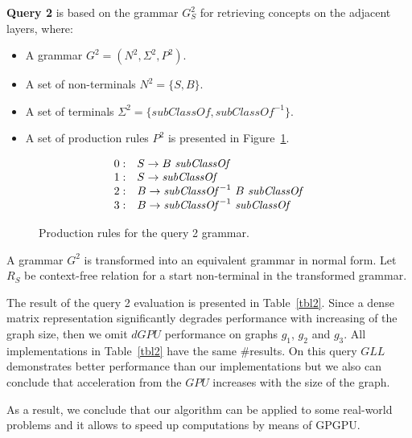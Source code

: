 \textbf{Query 2} is based on the grammar $G^2_S$ for retrieving concepts on the adjacent layers, where:
\begin{itemize}
    \item A grammar $G^2 = (N^2, \Sigma^2, P^2)$.
    \item A set of non-terminals $N^2 = \{S, B\}$.
    \item A set of terminals $\Sigma^2 = \{subClassOf, subClassOf^{-1}\}$.
    \item A set of production rules $P^2$ is presented in Figure~\ref{ProductionRulesQuery2}.
\end{itemize}

\begin{figure}[h]
   \[
\begin{array}{rl}
   0: & S \rightarrow B \ \text{\textit{subClassOf}} \\ 
   1: & S \rightarrow \text{\textit{subClassOf}} \\ 
   2: & B \rightarrow \text{\textit{subClassOf}}^{-1} \ B \ \text{\textit{subClassOf}} \\ 
   3: & B \rightarrow \text{\textit{subClassOf}}^{-1} \ \text{\textit{subClassOf}} \\ 
\end{array}
\]
\caption{Production rules for the query 2 grammar.}
\label{ProductionRulesQuery2}
\end{figure}

A grammar $G^2$ is transformed into an equivalent grammar in normal form. Let $R_S$ be context-free relation for a start non-terminal in the transformed grammar.

The result of the query 2 evaluation is presented in Table~\ref{tbl2}. Since a dense matrix representation significantly degrades performance with increasing of the graph size, then we omit $dGPU$ performance on graphs $g_1$, $g_2$ and $g_3$. All implementations in Table~\ref{tbl2} have the same \#results. On this query $GLL$ demonstrates better performance than our implementations but we also can conclude that acceleration from the $GPU$ increases with the size of the graph.

As a result, we conclude that our algorithm can be applied to some real-world problems and it allows to speed up computations by means of GPGPU.

